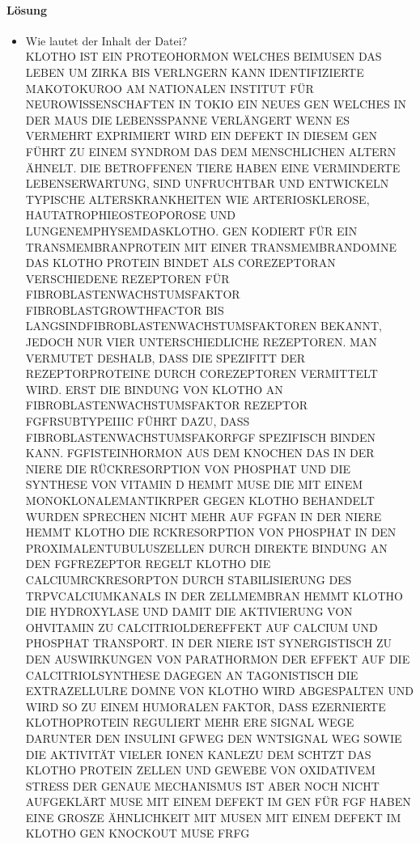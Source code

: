 \documentclass[12pt]{article}
\begin{document}
\paragraph{Lösung}
\begin{itemize}
	\item Wie lautet der Inhalt der Datei? \\
\footnotesize
KLOTHO IST EIN PROTEOHORMON WELCHES BEIMUSEN DAS LEBEN UM ZIRKA BIS VERLNGERN KANN IDENTIFIZIERTE MAKOTOKUROO AM NATIONALEN INSTITUT FÜR NEUROWISSENSCHAFTEN IN TOKIO EIN NEUES GEN WELCHES IN DER MAUS DIE LEBENSSPANNE VERLÄNGERT WENN ES VERMEHRT EXPRIMIERT WIRD EIN DEFEKT IN DIESEM GEN FÜHRT ZU EINEM SYNDROM
DAS DEM MENSCHLICHEN ALTERN ÄHNELT. DIE BETROFFENEN TIERE HABEN EINE VERMINDERTE LEBENSERWARTUNG, SIND UNFRUCHTBAR UND ENTWICKELN TYPISCHE ALTERSKRANKHEITEN WIE ARTERIOSKLEROSE, HAUTATROPHIEOSTEOPOROSE UND LUNGENEMPHYSEMDASKLOTHO. GEN KODIERT FÜR EIN TRANSMEMBRANPROTEIN MIT EINER TRANSMEMBRANDOMNE DAS KLOTHO PROTEIN BINDET ALS COREZEPTORAN VERSCHIEDENE REZEPTOREN FÜR FIBROBLASTENWACHSTUMSFAKTOR FIBROBLASTGROWTHFACTOR BIS LANGSINDFIBROBLASTENWACHSTUMSFAKTOREN BEKANNT, JEDOCH NUR VIER UNTERSCHIEDLICHE REZEPTOREN. MAN VERMUTET DESHALB, DASS DIE SPEZIFITT DER REZEPTORPROTEINE DURCH COREZEPTOREN VERMITTELT WIRD. ERST DIE BINDUNG VON KLOTHO AN FIBROBLASTENWACHSTUMSFAKTOR REZEPTOR FGFRSUBTYPEIIIC FÜHRT DAZU, DASS FIBROBLASTENWACHSTUMSFAKORFGF SPEZIFISCH BINDEN KANN. FGFISTEINHORMON AUS DEM KNOCHEN DAS IN DER NIERE DIE RÜCKRESORPTION VON PHOSPHAT UND  DIE SYNTHESE VON VITAMIN D HEMMT MUSE
 DIE MIT EINEM MONOKLONALEMANTIKRPER GEGEN KLOTHO BEHANDELT WURDEN SPRECHEN NICHT MEHR AUF FGFAN IN DER NIERE HEMMT KLOTHO DIE RCKRESORPTION VON PHOSPHAT IN DEN PROXIMALENTUBULUSZELLEN DURCH DIREKTE BINDUNG AN DEN FGFREZEPTOR REGELT KLOTHO DIE CALCIUMRCKRESORPTON DURCH STABILISIERUNG DES TRPVCALCIUMKANALS IN DER ZELLMEMBRAN HEMMT KLOTHO DIE HYDROXYLASE UND DAMIT DIE AKTIVIERUNG VON OHVITAMIN ZU CALCITRIOLDEREFFEKT AUF CALCIUM UND PHOSPHAT TRANSPORT. IN DER NIERE IST SYNERGISTISCH ZU DEN AUSWIRKUNGEN VON PARATHORMON DER EFFEKT AUF DIE CALCITRIOLSYNTHESE DAGEGEN AN TAGONISTISCH DIE  EXTRAZELLULRE
DOMNE VON KLOTHO WIRD ABGESPALTEN UND WIRD SO ZU EINEM HUMORALEN FAKTOR, DASS EZERNIERTE KLOTHOPROTEIN REGULIERT MEHR ERE SIGNAL WEGE DARUNTER DEN INSULINI GFWEG DEN WNTSIGNAL WEG SOWIE DIE AKTIVITÄT VIELER IONEN KANLEZU DEM SCHTZT DAS KLOTHO PROTEIN ZELLEN UND GEWEBE VON OXIDATIVEM STRESS DER GENAUE MECHANISMUS IST ABER NOCH NICHT AUFGEKLÄRT MUSE MIT EINEM DEFEKT IM GEN FÜR FGF HABEN EINE GROSZE ÄHNLICHKEIT MIT MUSEN MIT EINEM DEFEKT IM KLOTHO GEN KNOCKOUT MUSE FRFG

\end{itemize}
\end{document}
